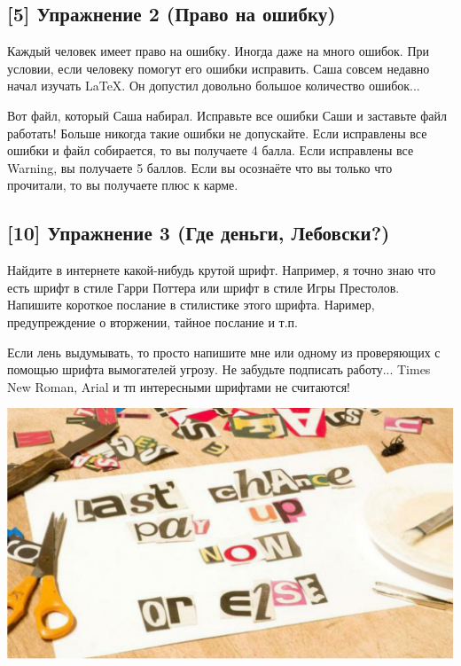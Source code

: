 \documentclass[12pt, a4paper, oneside]{article}
\begin{document}
\subsection*{[5]  Упражнение 2 (Право на ошибку)}


Каждый человек имеет право на ошибку. Иногда даже на много ошибок. При условии, если человеку помогут его ошибки исправить. Саша совсем недавно начал изучать LaTeX. Он допустил довольно большое количество ошибок...

Вот файл, который Саша набирал. Исправьте все ошибки Саши и заставьте файл работать! Больше никогда такие ошибки не допускайте. Если исправлены все ошибки и файл собирается, то вы получаете 4 балла. Если исправлены все Warning, вы получаете 5 баллов. Если вы осознаёте что вы только что прочитали, то вы получаете плюс к карме.


\subsection*{[10]  Упражнение 3 (Где деньги, Лебовски?)}

Найдите в интернете какой-нибудь крутой шрифт.  Например, я точно знаю что есть шрифт в стиле Гарри Поттера или шрифт в стиле Игры Престолов. Напишите короткое послание в стилистике этого шрифта. Наример, предупреждение о вторжении, тайное послание и т.п. 

Если лень выдумывать, то просто напишите мне или одному из проверяющих с помощью шрифта вымогателей угрозу.  Не забудьте подписать работу...   Times New Roman, Arial и тп интересными шрифтами не считаются!

\begin{center}
\includegraphics[scale=0.2]{letters.png}
\end{center} 
\end{document}
